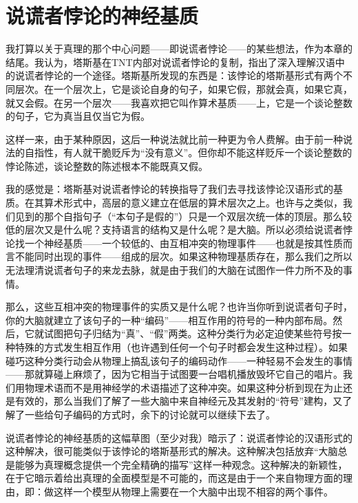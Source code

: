 \section{说谎者悖论的神经基质}

我打算以关于真理的那个中心问题——即说谎者悖论——的某些想法，作为本章的结尾。我认为，塔斯基在TNT内部对说谎者悖论的复制，指出了深入理解汉语中的说谎者悖论的一个途径。塔斯基所发现的东西是：该悖论的塔斯基形式有两个不同层次。在一个层次上，它是谈论自身的句子，如果它假，那就会真，如果它真，就又会假。在另一个层次——我喜欢把它叫作算术基质——上，它是一个谈论整数的句子，它为真当且仅当它为假。

这样一来，由于某种原因，这后一种说法就比前一种更为令人费解。由于前一种说法的自指性，有人就干脆贬斥为“没有意义”。但你却不能这样贬斥一个谈论整数的悖论陈述，谈论整数的陈述根本不能既真又假。

我的感觉是：塔斯基对说谎者悖论的转换指导了我们去寻找该悖论汉语形式的基质。在其算术形式中，高层的意义建立在低层的算术层次之上。也许与之类似，我们见到的那个自指句子（“本句子是假的”）只是一个双层次统一体的顶层。那么较低的层次又是什么呢？支持语言的结构又是什么呢？是大脑。所以必须给说谎者悖论找一个神经基质——一个较低的、由互相冲突的物理事件——也就是按其性质而言不能同时出现的事件——组成的层次。如果这种物理基质存在，那么我们之所以无法理清说谎者句子的来龙去脉，就是由于我们的大脑在试图作一件力所不及的事情。

那么，这些互相冲突的物理事件的实质又是什么呢？也许当你听到说谎者句子时，你的大脑就建立了该句子的一种“编码”——相互作用的符号的一种内部布局。然后，它就试图把句子归结为“真”、“假”两类。这种分类行为必定迫使某些符号按一种特殊的方式发生相互作用（也许遇到任何一个句子时都会发生这种过程）。如果碰巧这种分类行动会从物理上搞乱该句子的编码动作——一种轻易不会发生的事情——那就算碰上麻烦了，因为它相当于试图要一台唱机播放毁坏它自己的唱片。我们用物理术语而不是用神经学的术语描述了这种冲突。如果这种分析到现在为止还是有效的，那么当我们了解了一些大脑中来自神经元及其发射的“符号”建构，又了解了一些给句子编码的方式时，余下的讨论就可以继续下去了。

说谎者悖论的神经基质的这幅草图（至少对我）暗示了：说谎者悖论的汉语形式的这种解决，很可能类似于该悖论的塔斯基形式的解决。这种解决包括放弃“大脑总是能够为真理概念提供一个完全精确的描写”这样一种观念。这种解决的新颖性，在于它暗示着给出真理的全面模型是不可能的，而这是由于一个来自物理方面的理由，即：做这样一个模型从物理上需要在一个大脑中出现不相容的两个事件。
